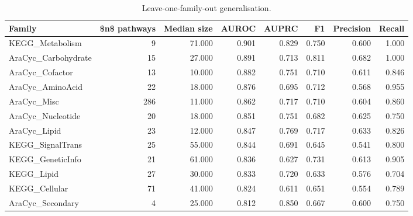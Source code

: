 \begin{table}[htbp]
\centering
\caption{Leave-one-family-out generalisation.}
\label{tab:lofo_recomputed}
\begin{tabular}{lrrrrrrr}
\toprule
Family & \$n\$ pathways & Median size & AUROC & AUPRC & F1 & Precision & Recall \\
\midrule
KEGG\_Metabolism & 9 & 71.000 & 0.901 & 0.829 & 0.750 & 0.600 & 1.000 \\
AraCyc\_Carbohydrate & 15 & 27.000 & 0.891 & 0.713 & 0.811 & 0.682 & 1.000 \\
AraCyc\_Cofactor & 13 & 10.000 & 0.882 & 0.751 & 0.710 & 0.611 & 0.846 \\
AraCyc\_AminoAcid & 22 & 18.000 & 0.876 & 0.695 & 0.712 & 0.568 & 0.955 \\
AraCyc\_Misc & 286 & 11.000 & 0.862 & 0.717 & 0.710 & 0.604 & 0.860 \\
AraCyc\_Nucleotide & 20 & 18.000 & 0.851 & 0.751 & 0.682 & 0.625 & 0.750 \\
AraCyc\_Lipid & 23 & 12.000 & 0.847 & 0.769 & 0.717 & 0.633 & 0.826 \\
KEGG\_SignalTrans & 25 & 55.000 & 0.844 & 0.691 & 0.645 & 0.541 & 0.800 \\
KEGG\_GeneticInfo & 21 & 61.000 & 0.836 & 0.627 & 0.731 & 0.613 & 0.905 \\
KEGG\_Lipid & 27 & 30.000 & 0.833 & 0.720 & 0.633 & 0.576 & 0.704 \\
KEGG\_Cellular & 71 & 41.000 & 0.824 & 0.611 & 0.651 & 0.554 & 0.789 \\
AraCyc\_Secondary & 4 & 25.000 & 0.812 & 0.850 & 0.667 & 0.600 & 0.750 \\
\bottomrule
\end{tabular}

\end{table}
